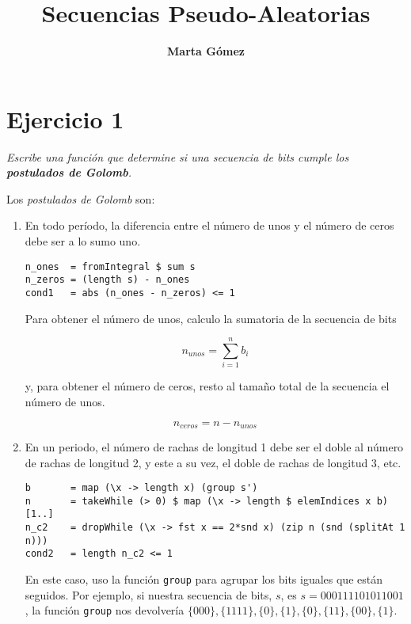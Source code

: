 \documentclass[10pt,spanish]{article}
\title{\fontfamily{pag}\selectfont \bfseries \Huge \color{azul} Secuencias Pseudo-Aleatorias}
\author{\fontfamily{pag}\selectfont \bfseries \LARGE Marta Gómez}
\begin{document}
\maketitle

\renewcommand{\tablename}{Tabla}

\section{\textcolor{azul}Ejercicio 1}
\textit{Escribe una función que determine si una secuencia de bits cumple los \textbf{\textcolor{azul}{postulados de Golomb}}.}

Los \textit{\textcolor{azul}{postulados de Golomb}} son:

\begin{enumerate}[1.]
\item En todo período, la diferencia entre el número de unos y el número de ceros debe ser a lo sumo uno.

\begin{verbatim}
n_ones  = fromIntegral $ sum s
n_zeros = (length s) - n_ones
cond1   = abs (n_ones - n_zeros) <= 1
\end{verbatim}

Para obtener el número de unos, calculo la sumatoria de la secuencia de bits 

\begin{displaymath}
    n_{unos} = \sum_{i=1}^n b_i
\end{displaymath}

y, para obtener el número de ceros, resto al tamaño total de la secuencia el número de unos.

\begin{displaymath}
    n_{ceros} = n - n_{unos}
\end{displaymath}

\item En un periodo, el número de rachas de longitud 1 debe ser el doble al número de rachas de longitud 2, y este a su vez, el doble de rachas de longitud 3, etc.

\begin{verbatim}
b       = map (\x -> length x) (group s')
n       = takeWhile (> 0) $ map (\x -> length $ elemIndices x b) [1..]
n_c2    = dropWhile (\x -> fst x == 2*snd x) (zip n (snd (splitAt 1 n))) 
cond2   = length n_c2 <= 1
\end{verbatim}

En este caso, uso la función \texttt{group} para agrupar los bits iguales que están seguidos. Por ejemplo, si nuestra secuencia de bits, $s$, es $s=000111101011001$, la función \texttt{group} nos devolvería $\{000\},\{1111\},\{0\},\{1\},\{0\},\{11\},\{00\},\{1\}$.



\end{enumerate}
\end{document}
